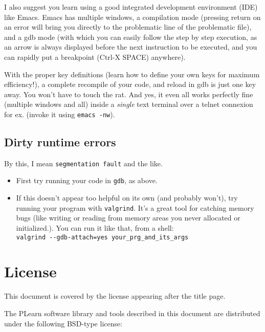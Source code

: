 \documentclass[11pt]{book}
\begin{document}
I also suggest you learn using a good integrated development
environment (IDE) like Emacs. Emacs has multiple windows, a compilation
mode (pressing return on an error will bring you directly to the
problematic line of the problematic file), and a gdb mode (with
which you can easily follow the step by step execution, as an arrow
is always displayed before the next instruction to be executed, and
you can rapidly put a breakpoint (Ctrl-X SPACE) anywhere).

With the proper key definitions (learn how to define your own keys for
maximum efficiency!), a complete recompile of your code, and reload in
gdb is just one key away.  You won't have to touch the rat. And yes,
it even all works perfectly fine (multiple windows and all) inside
a {\em single} text terminal over a telnet connexion for ex. (invoke
it using \verb!emacs -nw!).


\section{Dirty runtime errors}

By this, I mean {\tt segmentation fault} and the like.

\begin{itemize}
\item First try running your code in {\tt gdb}, as above.
\item If this doesn't appear too helpful on its own (and probably won't),
  try running your program with {\tt valgrind}. It's a great tool for
  catching memory bugs (like writing or reading from memory areas you never
  allocated or initialized.). You can run it like that, from a shell: \\
  \verb!valgrind --gdb-attach=yes your_prg_and_its_args!
\end{itemize}



\chapter*{License}

This document is covered by the license appearing after the title page.

The PLearn software library and tools described in this document are
distributed under the following BSD-type license:
\end{document}

